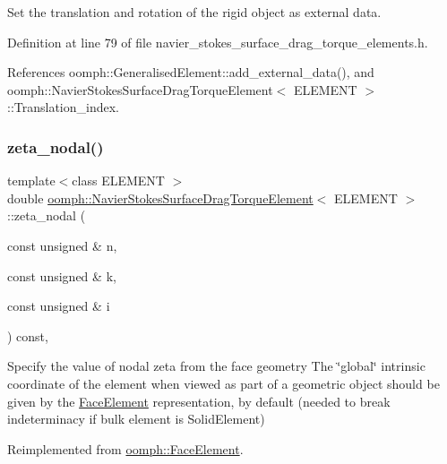 Set the translation and rotation of the rigid object as external data. 



Definition at line 79 of file navier\+\_\+stokes\+\_\+surface\+\_\+drag\+\_\+torque\+\_\+elements.\+h.



References oomph\+::\+Generalised\+Element\+::add\+\_\+external\+\_\+data(), and oomph\+::\+Navier\+Stokes\+Surface\+Drag\+Torque\+Element$<$ E\+L\+E\+M\+E\+N\+T $>$\+::\+Translation\+\_\+index.

\mbox{\label{classoomph_1_1NavierStokesSurfaceDragTorqueElement_af864929a9dbd0ed1d464db1a1d9a93b9}} 
\subsubsection{\texorpdfstring{zeta\+\_\+nodal()}{zeta\_nodal()}}
{\footnotesize\ttfamily template$<$class E\+L\+E\+M\+E\+NT $>$ \\
double \hyperlink{classoomph_1_1NavierStokesSurfaceDragTorqueElement}{oomph\+::\+Navier\+Stokes\+Surface\+Drag\+Torque\+Element}$<$ E\+L\+E\+M\+E\+NT $>$\+::zeta\+\_\+nodal (\begin{DoxyParamCaption}\item[{const unsigned \&}]{n,  }\item[{const unsigned \&}]{k,  }\item[{const unsigned \&}]{i }\end{DoxyParamCaption}) const\hspace{0.3cm}{\ttfamily [inline]}, {\ttfamily [virtual]}}



Specify the value of nodal zeta from the face geometry The \char`\"{}global\char`\"{} intrinsic coordinate of the element when viewed as part of a geometric object should be given by the \hyperlink{classoomph_1_1FaceElement}{Face\+Element} representation, by default (needed to break indeterminacy if bulk element is Solid\+Element) 



Reimplemented from \hyperlink{classoomph_1_1FaceElement_a58c9f93705c7741f76c8487d152e68a6}{oomph\+::\+Face\+Element}.



